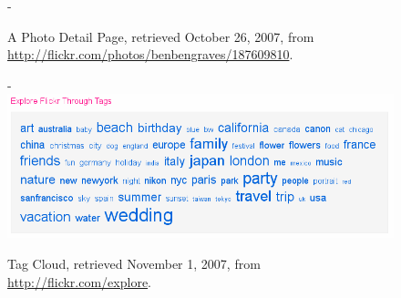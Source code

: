\begin{figure}[b]
\begin{adjustwidth*}{0em}{-\wholemargin}
\begin{minipage}[t]{0.475\wholewidth}
      \caption[Flickr Photo Detail Page]{%
         A Photo Detail Page,
         retrieved October 26, 2007, from
         \url{http://flickr.com/photos/benbengraves/187609810}.}
      \label{figure:scrsh.flickr.photo.detail}
    \end{minipage}
  \end{adjustwidth*}
  \normalcaption
\end{figure}

\begin{figure}
  \centering
  \strictpagechecktrue
  \begin{adjustwidth*}{0em}{-\wholemargin}
    \includegraphics[width=\wholewidth]{scrsh_flickr_tagcloud}
    \caption[Flickr Tag Cloud]{%
       Tag Cloud,
       retrieved November 1, 2007, from \url{http://flickr.com/explore}.}
    \label{figure:scrsh.flickr.tagcloud}
  \end{adjustwidth*}
\end{figure}

